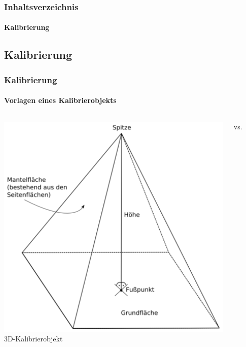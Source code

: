 \documentclass{beamer}
\begin{document}

\begin{frame}\frametitle{Inhaltsverzeichnis}\framesubtitle{Kalibrierung}
\end{frame}


\subsection{Kalibrierung}


\begin{frame}
	\frametitle{Kalibrierung}\framesubtitle{Vorlagen eines
	Kalibrierobjekts}
	\begin{columns}
		\begin{column}{0.45\textwidth}
			\centering
			\includegraphics[width=1\textwidth]{bilder/Pyramide.png}\\
			3D-Kalibrierobjekt
		\end{column}
		\begin{column}{0.1\textwidth}
			\centering
			vs.
		\end{column}
		\begin{column}{0.45\textwidth}

\end{column}
\end{columns}
\end{frame}
\end{document}
